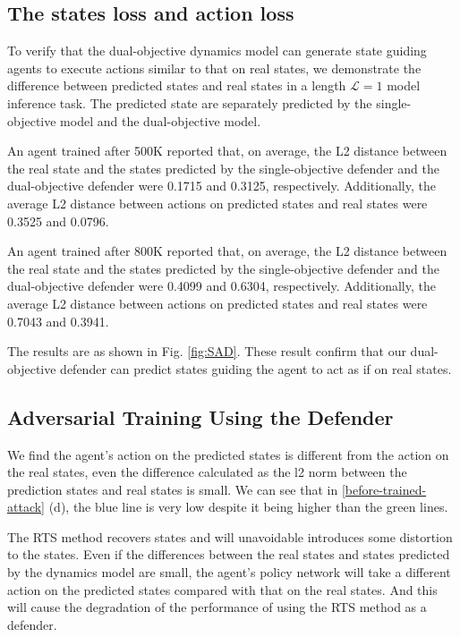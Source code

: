 \documentclass[letterpaper, 10 pt, conference]{ieeeconf}  %
\begin{document}
\subsection{The states loss and action loss}
To verify that the dual-objective dynamics model can generate state guiding agents to execute actions similar to that on real states, we demonstrate the difference between predicted states and real states in a length $\mathcal{L}=1$ model inference task. The predicted state are separately predicted by the single-objective model and the dual-objective model.

An agent trained after 500K reported that, on average, the L2 distance between the real state and the states predicted by the single-objective defender and the dual-objective defender were 0.1715 and 0.3125, respectively. Additionally, the average L2 distance between actions on predicted states and real states were 0.3525 and 0.0796.

An agent trained after 800K reported that, on average, the L2 distance between the real state and the states predicted by the single-objective defender and the dual-objective defender were 0.4099 and 0.6304, respectively. Additionally, the average L2 distance between actions on predicted states and real states were 0.7043 and 0.3941.

The results are as shown in Fig. \ref{fig:SAD}. These result confirm that our dual-objective defender can predict states guiding the agent to act as if on real states.



\iffalse
\subsection{Adversarial Training Using the Defender}

We find the agent’s action on the predicted states is different from the action on the real states, even the difference calculated as the l2 norm between the prediction states and real states is small. We can see that in \ref{before-trained-attack} (d), the blue line is very low despite it being higher than the green lines. 

The RTS method recovers states and will unavoidable introduces some distortion to the states. Even if the differences between the real states and states predicted by the dynamics model are small, the agent's policy network will take a different action on the predicted states compared with that on the real states. And this will cause the degradation of the performance of using the RTS method as a defender.
\end{document}
